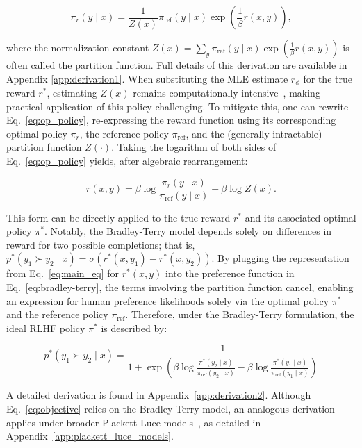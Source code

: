 \begin{equation}\label{eq:op_policy}
    \pi_r(y\mid x) = \frac{1}{Z(x)}\pi_\text{ref}(y\mid x)\exp\left(\frac{1}{\beta}r(x, y)\right),
\end{equation}

where the normalization constant $Z(x) =\sum_{y}\pi_\text{ref}(y\mid x)\exp\left(\frac{1}{\beta}r(x, y)\right)$ is often called the partition function. Full details of this derivation are available in Appendix \ref{app:derivation1}. When substituting the MLE estimate $r_{\phi}$ for the true reward $r^*$, estimating $Z(x)$ remains computationally intensive~\citep{korbak2022reinforcement, go2023aligning}, making practical application of this policy challenging. To mitigate this, one can rewrite Eq.~\ref{eq:op_policy}, re-expressing the reward function using its corresponding optimal policy $\pi_r$, the reference policy $\pi_\text{ref}$, and the (generally intractable) partition function $Z(\cdot)$. Taking the logarithm of both sides of Eq.~\ref{eq:op_policy} yields, after algebraic rearrangement:

\begin{equation}\label{eq:main_eq}
    r(x,y) =\beta \log \frac{\pi_r(y\mid x)}{\pi_\text{ref}(y\mid x)} + \beta \log Z(x).
\end{equation}

This form can be directly applied to the true reward $r^*$ and its associated optimal policy $\pi^*$. Notably, the Bradley-Terry model depends solely on differences in reward for two possible completions; that is, ${p^*(y_1 \succ y_2 \mid x) = \sigma(r^*(x, y_1) - r^*(x, y_2))}$. By plugging the representation from Eq.~\ref{eq:main_eq} for $r^*(x,y)$ into the preference function in Eq.~\ref{eq:bradley-terry}, the terms involving the partition function cancel, enabling an expression for human preference likelihoods solely via the optimal policy $\pi^*$ and the reference policy $\pi_\text{ref}$. Therefore, under the Bradley-Terry formulation, the ideal RLHF policy $\pi^*$ is described by:

\begin{equation}\label{eq:objective}
    p^*(y_1\succ y_2 \mid x)=\frac{1}{1 + \exp\left(\beta \log \frac{\pi^*(y_2\mid x)}{\pi_\text{ref}(y_2\mid x)} - \beta \log \frac{\pi^*(y_1\mid x)}{\pi_\text{ref}(y_1\mid x)}\right)}
\end{equation}

A detailed derivation is found in Appendix~\ref{app:derivation2}. Although Eq.~\ref{eq:objective} relies on the Bradley-Terry model, an analogous derivation applies under broader Plackett-Luce models~\citep{plackett1975analysis, luce2012individual}, as detailed in Appendix~\ref{app:plackett_luce_models}.

